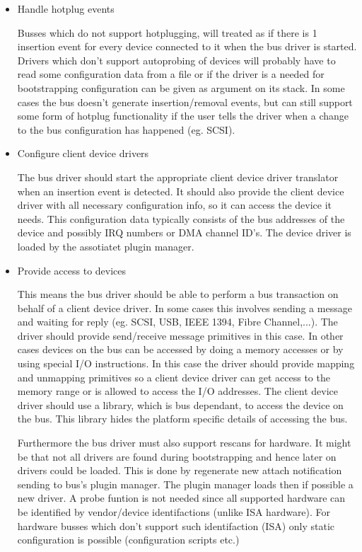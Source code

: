 \begin{itemize}
\item Handle hotplug events

  Busses which do not support hotplugging, will treated as if there is
  1 insertion event for every device connected to it when the bus
  driver is started.  Drivers which don't support autoprobing of
  devices will probably have to read some configuration data from a
  file or if the driver is a needed for bootstrapping configuration
  can be given as argument on its stack.  In some cases the bus
  doesn't generate insertion/removal events, but can still support
  some form of hotplug functionality if the user tells the driver when
  a change to the bus configuration has happened (eg. SCSI).
\item Configure client device drivers

  The bus driver should start the appropriate client device driver
  translator when an insertion event is detected.  It should also
  provide the client device driver with all necessary configuration
  info, so it can access the device it needs.  This configuration data
  typically consists of the bus addresses of the device and possibly
  IRQ numbers or DMA channel ID's.  The device driver is loaded by the
  assotiatet plugin manager.
\item Provide access to devices

  This means the bus driver should be able to perform a bus
  transaction on behalf of a client device driver.  In some cases this
  involves sending a message and waiting for reply (eg. SCSI, USB,
  IEEE 1394, Fibre Channel,...).  The driver should provide
  send/receive message primitives in this case.  In other cases
  devices on the bus can be accessed by doing a memory accesses or by
  using special I/O instructions.  In this case the driver should
  provide mapping and unmapping primitives so a client device driver
  can get access to the memory range or is allowed to access the I/O
  addresses.  The client device driver should use a library, which is
  bus dependant, to access the device on the bus.  This library hides
  the platform specific details of accessing the bus.
  
  Furthermore the bus driver must also support rescans for hardware.
  It might be that not all drivers are found during bootstrapping and
  hence later on drivers could be loaded.  This is done by regenerate
  new attach notification sending to bus's plugin manager.  The plugin
  manager loads then if possible a new driver.  A probe funtion is not
  needed since all supported hardware can be identified by
  vendor/device identifactions (unlike ISA hardware).  For hardware
  busses which don't support such identifaction (ISA) only static
  configuration is possible (configuration scripts etc.)
\end{itemize}

